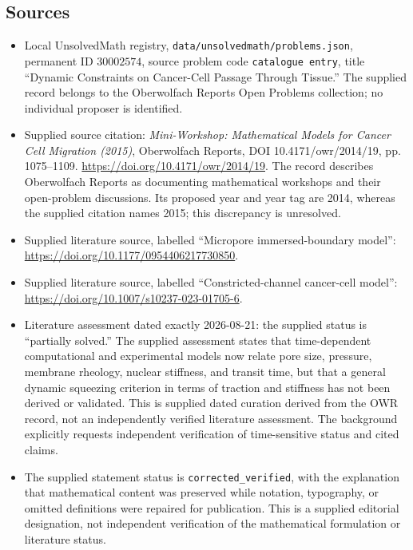 \documentclass[11pt]{article}
\begin{document}
\subsection{Sources}
\begin{itemize}
\item Local UnsolvedMath registry, \texttt{data/unsolvedmath/problems.json}, permanent ID \(30002574\), source problem code \texttt{catalogue entry}, title ``Dynamic Constraints on Cancer-Cell Passage Through Tissue.'' The supplied record belongs to the Oberwolfach Reports Open Problems collection; no individual proposer is identified.
\item Supplied source citation: \emph{Mini-Workshop: Mathematical Models for Cancer Cell Migration (2015)}, Oberwolfach Reports, DOI 10.4171/owr/2014/19, pp. 1075--1109. \url{https://doi.org/10.4171/owr/2014/19}. The record describes Oberwolfach Reports as documenting mathematical workshops and their open-problem discussions. Its proposed year and year tag are 2014, whereas the supplied citation names 2015; this discrepancy is unresolved.
\item Supplied literature source, labelled ``Micropore immersed-boundary model'': \url{https://doi.org/10.1177/0954406217730850}.
\item Supplied literature source, labelled ``Constricted-channel cancer-cell model'': \url{https://doi.org/10.1007/s10237-023-01705-6}.
\item Literature assessment dated exactly 2026-08-21: the supplied status is ``partially solved.'' The supplied assessment states that time-dependent computational and experimental models now relate pore size, pressure, membrane rheology, nuclear stiffness, and transit time, but that a general dynamic squeezing criterion in terms of traction and stiffness has not been derived or validated. This is supplied dated curation derived from the OWR record, not an independently verified literature assessment. The background explicitly requests independent verification of time-sensitive status and cited claims.
\item The supplied statement status is \texttt{corrected\_verified}, with the explanation that mathematical content was preserved while notation, typography, or omitted definitions were repaired for publication. This is a supplied editorial designation, not independent verification of the mathematical formulation or literature status.
\end{itemize}
\end{document}
